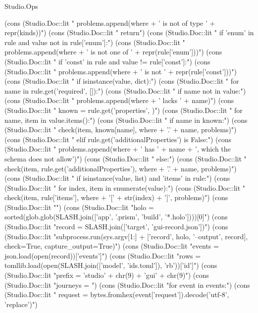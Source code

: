\begin{lexlean}{Studio.Ops}
\begin{semanticmodule}
{{    (cons (Studio.Doc::lit "            problems.append(where + ' is not of type ' + repr(kinds))\n")
    (cons (Studio.Doc::lit "            return\n")
    (cons (Studio.Doc::lit "    if 'enum' in rule and value not in rule['enum']:\n")
    (cons (Studio.Doc::lit "        problems.append(where + ' is not one of ' + repr(rule['enum']))\n")
    (cons (Studio.Doc::lit "    if 'const' in rule and value != rule['const']:\n")
    (cons (Studio.Doc::lit "        problems.append(where + ' is not ' + repr(rule['const']))\n")
    (cons (Studio.Doc::lit "    if isinstance(value, dict):\n")
    (cons (Studio.Doc::lit "        for name in rule.get('required', []):\n")
    (cons (Studio.Doc::lit "            if name not in value:\n")
    (cons (Studio.Doc::lit "                problems.append(where + ' lacks ' + name)\n")
    (cons (Studio.Doc::lit "        known = rule.get('properties', {})\n")
    (cons (Studio.Doc::lit "        for name, item in value.items():\n")
    (cons (Studio.Doc::lit "            if name in known:\n")
    (cons (Studio.Doc::lit "                check(item, known[name], where + '.' + name, problems)\n")
    (cons (Studio.Doc::lit "            elif rule.get('additionalProperties') is False:\n")
    (cons (Studio.Doc::lit "                problems.append(where + ' has ' + name + ', which the schema does not allow')\n")
    (cons (Studio.Doc::lit "            else:\n")
    (cons (Studio.Doc::lit "                check(item, rule.get('additionalProperties'), where + '.' + name, problems)\n")
    (cons (Studio.Doc::lit "    if isinstance(value, list) and 'items' in rule:\n")
    (cons (Studio.Doc::lit "        for index, item in enumerate(value):\n")
    (cons (Studio.Doc::lit "            check(item, rule['items'], where + '[' + str(index) + ']', problems)\n")
    (cons (Studio.Doc::lit "\n")
    (cons (Studio.Doc::lit "holo = sorted(glob.glob(SLASH.join(['app', '.prism', 'build', '*.holo'])))[0]\n")
    (cons (Studio.Doc::lit "record = SLASH.join(['target', 'gui-record.json'])\n")
    (cons (Studio.Doc::lit "subprocess.run(sys.argv[1:] + ['record', holo, '--output', record], check=True, capture_output=True)\n")
    (cons (Studio.Doc::lit "events = json.load(open(record))['events']\n")
    (cons (Studio.Doc::lit "rows = tomllib.load(open(SLASH.join(['model', 'ids.toml']), 'rb'))['id']\n")
    (cons (Studio.Doc::lit "prefix = 'studio' + chr(9) + 'gui' + chr(9)\n")
    (cons (Studio.Doc::lit "journeys = {}\n")
    (cons (Studio.Doc::lit "for event in events:\n")
    (cons (Studio.Doc::lit "    request = bytes.fromhex(event['request']).decode('utf-8', 'replace')\n")
}}
\end{semanticmodule}
\end{lexlean}
